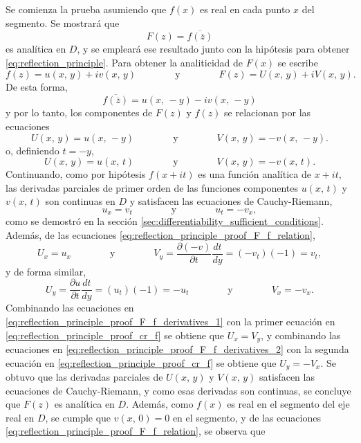 \documentclass[a4paper]{report}
\begin{document}
Se comienza la prueba asumiendo que \(f(x)\) es real en cada punto \(x\) del segmento. Se mostrará que 
\begin{equation}\label{eq:reflection_principle_proof_F}
 F(z)=\overline{f(\overline{z})}
\end{equation}
es analítica en \(D\), y se empleará ese resultado junto con la hipótesis para obtener \ref{eq:reflection_principle}. Para obtener la analiticidad de \(F(x)\) se escribe
\[
 f(z)=u(x,\,y)+iv(x,\,y)
 \qquad\qquad\textrm{y}\qquad\qquad
 F(z)=U(x,\,y)+iV(x,\,y).
\]
De esta forma,
\begin{equation}\label{eq:reflection_principle_f_reflected_components}
 \overline{f(\overline{z})}=u(x,\,-y)-iv(x,\,-y) 
\end{equation}
y por lo tanto, los componentes de \(F(z)\) y \(f(z)\) se relacionan por las ecuaciones
\[
 U(x,\,y)=u(x,\,-y)
 \qquad\qquad\textrm{y}\qquad\qquad
 V(x,\,y)=-v(x,\,-y).
\]
o, definiendo \(t=-y\),
\begin{equation}\label{eq:reflection_principle_proof_F_f_relation}
 U(x,\,y)=u(x,\,t)
 \qquad\qquad\textrm{y}\qquad\qquad
 V(x,\,y)=-v(x,\,t).
\end{equation}
Continuando, como por hipótesis \(f(x+it)\) es una función analítica de \(x+it\), las derivadas parciales de primer orden de las funciones componentes \(u(x,\,t)\) y \(v(x,\,t)\) son continuas en \(D\) y satisfacen las ecuaciones de Cauchy-Riemann, 
\begin{equation}\label{eq:reflection_principle_proof_cr_f}
 u_x=v_t
 \qquad\qquad\textrm{y}\qquad\qquad
 u_t=-v_x, 
\end{equation}
como se demostró en la sección \ref{sec:differentiability_sufficient_conditions}. Además, de las ecuaciones \ref{eq:reflection_principle_proof_F_f_relation},
\begin{equation}\label{eq:reflection_principle_proof_F_f_derivatives_1}
  U_x=u_x
 \qquad\qquad\textrm{y}\qquad\qquad
 V_y=\frac{\partial(-v)}{\partial t}\frac{dt}{dy}=(-v_t)(-1)=v_t,
\end{equation}
y de forma similar,
\begin{equation}\label{eq:reflection_principle_proof_F_f_derivatives_2}
 U_y=\frac{\partial u}{\partial t}\frac{dt}{dy}=(u_t)(-1)=-u_t
 \qquad\qquad\textrm{y}\qquad\qquad
 V_x=-v_x.
\end{equation}
Combinando las ecuaciones en \ref{eq:reflection_principle_proof_F_f_derivatives_1} con la primer ecuación en \ref{eq:reflection_principle_proof_cr_f} se obtiene que \(U_x=V_y\), y combinando las ecuaciones en \ref{eq:reflection_principle_proof_F_f_derivatives_2} con la segunda ecuación en \ref{eq:reflection_principle_proof_cr_f} se obtiene que \(U_y=-V_x\). Se obtuvo que las derivadas parciales de \(U(x,\,y)\) y \(V(x,\,y)\) satisfacen las ecuaciones de Cauchy-Riemann, y como esas derivadas son continuas, se concluye que \(F(z)\) es analítica en \(D\). Además, como \(f(x)\) es real en el segmento del eje real en \(D\), se cumple que \(v(x,\,0)=0\) en el segmento, y de las ecuaciones \ref{eq:reflection_principle_proof_F_f_relation}, se observa que 
\end{document}
